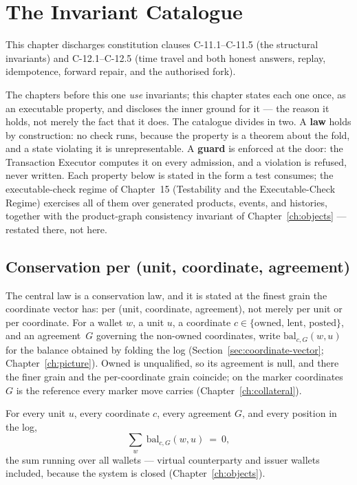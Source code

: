 \section{The Invariant Catalogue}\label{ch:invariants}

This chapter discharges constitution clauses C-11.1--C-11.5 (the structural invariants) and C-12.1--C-12.5 (time travel and both honest answers, replay, idempotence, forward repair, and the authorised fork).

The chapters before this one \emph{use} invariants; this chapter states each one
once, as an executable property, and discloses the inner ground for it --- the
reason it holds, not merely the fact that it does. The catalogue divides in two.
A \textbf{law} holds by construction: no check runs, because the property is a
theorem about the fold, and a state violating it is unrepresentable. A
\textbf{guard} is enforced at the door: the Transaction Executor computes it on
every admission, and a violation is refused, never written. Each property below
is stated in the form a test consumes; the executable-check regime of Chapter~15
(Testability and the Executable-Check Regime) exercises all of them over
generated products, events, and histories, together with the product-graph
consistency invariant of Chapter~\ref{ch:objects} --- restated there, not here.

\subsection{Conservation per (unit, coordinate, agreement)}

The central law is a conservation law, and it is stated at the finest grain the coordinate
vector has: per (unit, coordinate, agreement), not merely per unit or per coordinate. For a
wallet $w$, a unit $u$, a coordinate $c\in\{\text{owned, lent, posted}\}$, and an
agreement~$G$ governing the non-owned coordinates, write $\mathrm{bal}_{c,G}(w,u)$ for the
balance obtained by folding the log (Section~\ref{sec:coordinate-vector};
Chapter~\ref{ch:picture}). Owned is unqualified, so its agreement is null, and there the
finer grain and the per-coordinate grain coincide; on the marker coordinates $G$ is the
reference every marker move carries (Chapter~\ref{ch:collateral}).

\begin{theorem}[Conservation]\label{thm:conservation}
For every unit $u$, every coordinate $c$, every agreement $G$, and every position in the
log,
\[
\sum_{w}\ \mathrm{bal}_{c,G}(w,u)\ =\ 0,
\]
the sum running over all wallets --- virtual counterparty and issuer wallets
included, because the system is closed (Chapter~\ref{ch:objects}).
\end{theorem}

